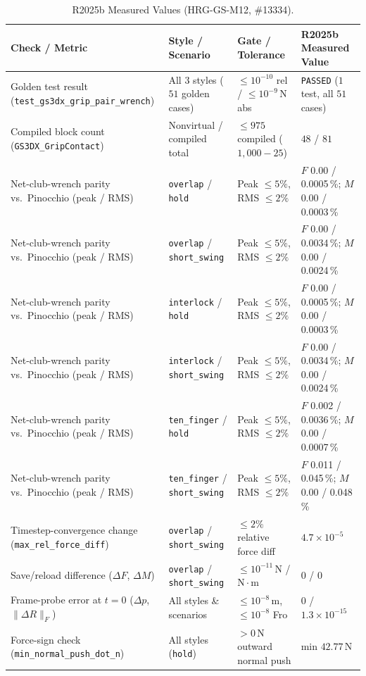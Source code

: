 \documentclass[11pt,a4paper]{article}
\begin{document}
\begin{table}[htbp]
\centering
\small
\begin{tabular}{llll}
\toprule
\textbf{Check / Metric} & \textbf{Style / Scenario} & \textbf{Gate / Tolerance} & \textbf{R2025b Measured Value} \\
\midrule
Golden test result (\texttt{test\_gs3dx\_grip\_pair\_wrench}) & All $3$ styles ($51$ golden cases) & $\le 10^{-10}$ rel / $\le 10^{-9}\,\mathrm{N}$ abs & \texttt{PASSED} ($1$ test, all $51$ cases) \\
Compiled block count (\texttt{GS3DX\_GripContact}) & Nonvirtual / compiled total & $\le 975$ compiled ($1{,}000 - 25$) & $48$ / $81$ \\
Net-club-wrench parity vs.\ Pinocchio (peak / RMS) & \texttt{overlap} / \texttt{hold} & Peak $\le 5\%$, RMS $\le 2\%$ & $F$ 0.00 / 0.0005\,\%; $M$ 0.00 / 0.0003\,\% \\
Net-club-wrench parity vs.\ Pinocchio (peak / RMS) & \texttt{overlap} / \texttt{short\_swing} & Peak $\le 5\%$, RMS $\le 2\%$ & $F$ 0.00 / 0.0034\,\%; $M$ 0.00 / 0.0024\,\% \\
Net-club-wrench parity vs.\ Pinocchio (peak / RMS) & \texttt{interlock} / \texttt{hold} & Peak $\le 5\%$, RMS $\le 2\%$ & $F$ 0.00 / 0.0005\,\%; $M$ 0.00 / 0.0003\,\% \\
Net-club-wrench parity vs.\ Pinocchio (peak / RMS) & \texttt{interlock} / \texttt{short\_swing} & Peak $\le 5\%$, RMS $\le 2\%$ & $F$ 0.00 / 0.0034\,\%; $M$ 0.00 / 0.0024\,\% \\
Net-club-wrench parity vs.\ Pinocchio (peak / RMS) & \texttt{ten\_finger} / \texttt{hold} & Peak $\le 5\%$, RMS $\le 2\%$ & $F$ 0.002 / 0.0036\,\%; $M$ 0.00 / 0.0007\,\% \\
Net-club-wrench parity vs.\ Pinocchio (peak / RMS) & \texttt{ten\_finger} / \texttt{short\_swing} & Peak $\le 5\%$, RMS $\le 2\%$ & $F$ 0.011 / 0.045\,\%; $M$ 0.00 / 0.048\,\% \\
Timestep-convergence change (\texttt{max\_rel\_force\_diff}) & \texttt{overlap} / \texttt{short\_swing} & $\le 2\%$ relative force diff & $4.7\times10^{-5}$ \\
Save/reload difference ($\Delta F$, $\Delta M$) & \texttt{overlap} / \texttt{short\_swing} & $\le 10^{-11}\,\mathrm{N}$ / $\mathrm{N\cdot m}$ & $0$ / $0$ \\
Frame-probe error at $t = 0$ ($\Delta p$, $\|\Delta R\|_F$) & All styles \& scenarios & $\le 10^{-8}\,\mathrm{m}$, $\le 10^{-8}$ Fro & $0$ / $1.3\times10^{-15}$ \\
Force-sign check (\texttt{min\_normal\_push\_dot\_n}) & All styles (\texttt{hold}) & $> 0\,\mathrm{N}$ outward normal push & min $42.77\,\mathrm{N}$ \\
\bottomrule
\end{tabular}
\caption{R2025b Measured Values (HRG-GS-M12, \#13334).}
\label{tab:m12_r2025b_pending}
\end{table}
\end{document}
